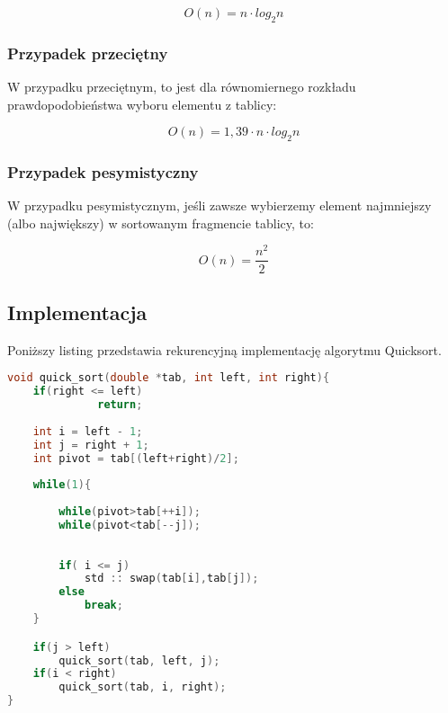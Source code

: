 \documentclass[12pt]{article}
\begin{document}
{ \Large \begin{equation*}
       O(n) = n \cdot log_2 n 
\end{equation*}}
\subsubsection{Przypadek przeciętny}
W przypadku przeciętnym, to jest dla równomiernego rozkładu prawdopodobieństwa wyboru elementu z tablicy: 


{ \Large \begin{equation*}
       O(n) = 1,39 \cdot n \cdot log_2 n 
\end{equation*}}

\subsubsection{Przypadek pesymistyczny}
W przypadku pesymistycznym, jeśli zawsze wybierzemy element najmniejszy (albo największy) w sortowanym fragmencie tablicy, to: 


{\Large \begin{equation*}
       O(n) = \frac{n^2}{2}
\end{equation*}}

\subsection{Implementacja}
Poniższy listing przedstawia rekurencyjną implementację algorytmu Quicksort. 

\begin{lstlisting}[language=C++]
void quick_sort(double *tab, int left, int right){
	if(right <= left) 
              return;
	
	int i = left - 1;
    int j = right + 1; 
    int pivot = tab[(left+right)/2]; 
	
	while(1){
		
		while(pivot>tab[++i]);
		while(pivot<tab[--j]);
		
		
		if( i <= j)
			std :: swap(tab[i],tab[j]);
		else
			break;
	}

	if(j > left)
	    quick_sort(tab, left, j);
	if(i < right)
	    quick_sort(tab, i, right);
}
\end{lstlisting}
\end{document}
